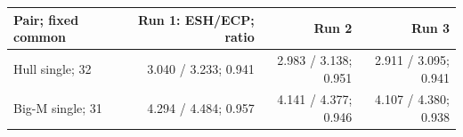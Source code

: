 \begin{tabular}{lrrr}
\toprule
Pair; fixed common & Run 1: ESH/ECP; ratio & Run 2 & Run 3 \\
\midrule
Hull single; 32 & 3.040 / 3.233; 0.941 & 2.983 / 3.138; 0.951 & 2.911 / 3.095; 0.941 \\
Big-M single; 31 & 4.294 / 4.484; 0.957 & 4.141 / 4.377; 0.946 & 4.107 / 4.380; 0.938 \\
\bottomrule
\end{tabular}
